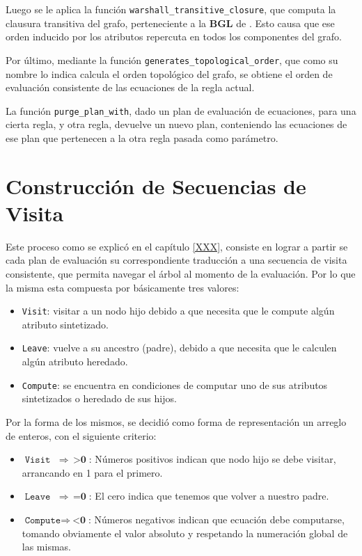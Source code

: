 Luego se le aplica la función \texttt{warshall\_transitive\_closure}, que computa la clausura transitiva del grafo, perteneciente a la \textbf{BGL} de \boost. Esto causa que ese orden inducido por los atributos repercuta en todos los componentes del grafo.

Por último, mediante la función \texttt{generates\_topological\_order}, que como su nombre lo indica calcula el orden topológico del grafo, se obtiene el orden de evaluación consistente de las ecuaciones de la regla actual.

La función \texttt{purge\_plan\_with}, dado un plan de evaluación de ecuaciones, para una cierta regla, y otra regla, devuelve un nuevo plan, conteniendo las ecuaciones de ese plan que pertenecen a la otra regla pasada como parámetro.

\section{Construcción de Secuencias de Visita}

Este proceso como se explicó en el capítulo \ref{XXX}, consiste en lograr a partir se cada plan de evaluación su correspondiente traducción a una secuencia de visita consistente, que permita navegar el árbol al momento de la evaluación. Por lo que la misma esta compuesta por básicamente tres valores:

\begin{itemize}
\item \texttt{Visit}: visitar a un nodo hijo debido a que necesita que le compute algún atributo sintetizado.
\item \texttt{Leave}: vuelve a su ancestro (padre), debido a que necesita que le calculen algún atributo heredado.
\item \texttt{Compute}: se encuentra en condiciones de computar uno de sus atributos sintetizados o heredado de sus hijos.
\end{itemize}

Por la forma de los mismos, se decidió como forma de representación un arreglo de enteros, con el siguiente criterio:

\begin{itemize}
\item $\texttt{Visit}\ \ \ \  \Rightarrow \ \ \textbf{>0}$: Números positivos indican que nodo hijo se debe visitar, arrancando en 1 para el primero.
\item $\texttt{Leave}\ \ \ \  \Rightarrow \ \ \textbf{=0}$: El cero indica que tenemos que volver a nuestro padre.
\item $\texttt{Compute} \Rightarrow \ \textbf{<0}$: Números negativos indican que ecuación debe computarse, tomando obviamente el valor absoluto y respetando la numeración global de las mismas.
\end{itemize}

